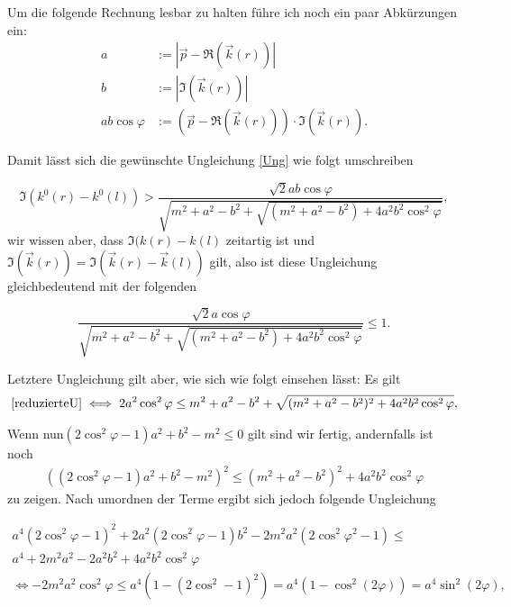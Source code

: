 \documentclass[a4paper,12pt]{article}
\begin{document}
Um die folgende Rechnung lesbar zu halten führe ich noch ein paar Abkürzungen ein:
\begin{subequations}
\begin{align}
a&:= | \vec{p}-\Re (\vec{k}(r))|\\
b&:=|\Im (\vec{k}(r))|\\
a b \cos\varphi&:=(\vec{p}-\Re (\vec{k}(r))) \cdot \Im (\vec{k}(r)).
\end{align}
\end{subequations}

Damit lässt sich die gewünschte Ungleichung \eqref{Ung} wie folgt umschreiben

\begin{equation}
\Im (k^0(r)-k^0(l))> \frac{\sqrt{2} a b \cos \varphi}{\sqrt{m^2 + a^2 - b^2 + \sqrt{(m^2 + a^2 - b^2)+4 a^2 b ^2 \cos^2\varphi}}},
\end{equation}
wir wissen aber, dass \(\Im (k(r)-k(l)\) zeitartig ist und \(\Im (\vec{k}(r)) = \Im(\vec{k}(r)-\vec{k}(l)) \) gilt,
also ist diese Ungleichung gleichbedeutend mit der folgenden

\begin{equation}\label{reduzierteU}
\frac{\sqrt{2} a \cos \varphi}{\sqrt{m^2 + a^2 - b^2 + \sqrt{(m^2 + a^2 - b^2)+4 a^2 b ^2 \cos^2\varphi}}}\le 1.
\end{equation}

Letztere Ungleichung gilt aber, wie sich wie folgt einsehen lässt: Es gilt
\begin{align}
\eqref{reduzierteU}\iff 2 a^2 \cos^2\varphi \le m^2 + a^2 - b^2 + \sqrt{(m^2 + a^2 - b^2)^2 + 4 a^2 b^2 \cos^2 \varphi},
\end{align}

Wenn nun\( (2\cos^2\varphi - 1)a^2 + b^2 - m^2 \le 0\) gilt sind wir fertig, andernfalls ist noch
\begin{align}
( (2\cos^2\varphi -1)a^2 + b^2 -m^2)^2 \le (m^2 + a^2 - b^2)^2 + 4a^2 b^2 \cos^2 \varphi
\end{align}
zu zeigen. Nach umordnen der Terme ergibt sich jedoch folgende Ungleichung

\begin{align}
a^4 (2\cos^2\varphi - 1)^2 + 2 a^2 (2\cos^2\varphi-1) b^2 - 2 m^2 a^2 (2\cos^2\varphi^2-1) \le \\
a^4 + 2 m^2a^2 -2a^2 b^2  + 4 a^2 b^2 \cos^2\varphi\\
\iff 
-2m^2a^2\cos^2\varphi \le a^4(1-(2\cos^2-1)^2) = a^4 (1-\cos^2(2\varphi))=a^4\sin^2(2\varphi),
\end{align}
\end{document}
